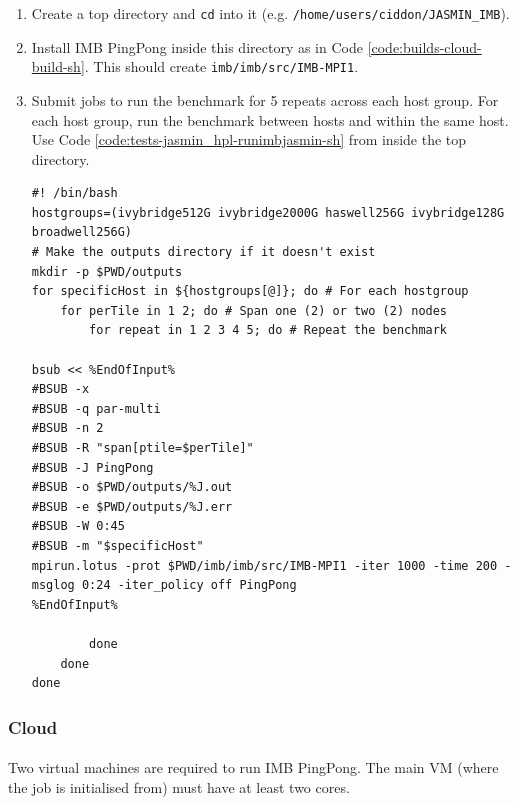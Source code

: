 \documentclass{article}
\newenvironment{code}{\captionsetup{type=listing}}{}
\begin{document}
            \begin{enumerate}
                \item Create a top directory and \verb|cd| into it (e.g. \verb|/home/users/ciddon/JASMIN_IMB|).
                \item Install IMB PingPong inside this directory as in Code \ref{code:builds-cloud-build-sh}. This should create \verb|imb/imb/src/IMB-MPI1|.
                \item Submit jobs to run the benchmark for 5 repeats across each host group. For each host group, run the benchmark between hosts and within the same host. Use Code \ref{code:tests-jasmin_hpl-runimbjasmin-sh} from inside the top directory.

                    \begin{code}
                    \label{code:tests-jasmin_hpl-runimbjasmin-sh}
                    \begin{verbatim}
#! /bin/bash
hostgroups=(ivybridge512G ivybridge2000G haswell256G ivybridge128G broadwell256G)
# Make the outputs directory if it doesn't exist
mkdir -p $PWD/outputs
for specificHost in ${hostgroups[@]}; do # For each hostgroup
    for perTile in 1 2; do # Span one (2) or two (2) nodes
        for repeat in 1 2 3 4 5; do # Repeat the benchmark

bsub << %EndOfInput%
#BSUB -x
#BSUB -q par-multi
#BSUB -n 2
#BSUB -R "span[ptile=$perTile]"
#BSUB -J PingPong
#BSUB -o $PWD/outputs/%J.out
#BSUB -e $PWD/outputs/%J.err
#BSUB -W 0:45
#BSUB -m "$specificHost"
mpirun.lotus -prot $PWD/imb/imb/src/IMB-MPI1 -iter 1000 -time 200 -msglog 0:24 -iter_policy off PingPong
%EndOfInput%

        done
    done
done
                    \end{verbatim}
                    \end{code}
            \end{enumerate}
        \subsubsection{Cloud}

            \paragraph{}
            Two virtual machines are required to run IMB PingPong. The main VM (where the job is initialised from) must have at least two cores.
\end{document}
